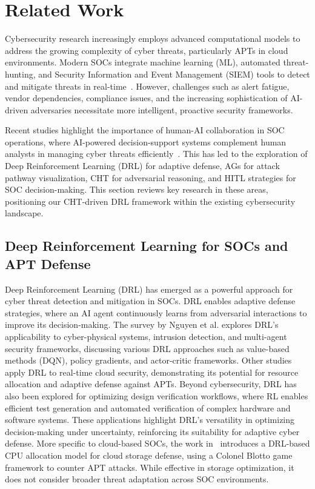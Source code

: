\section{Related Work}
Cybersecurity research increasingly employs advanced computational models to address the growing complexity of cyber threats, particularly APTs in cloud environments. Modern SOCs integrate machine learning (ML), automated threat-hunting, and Security Information and Event Management (SIEM) tools to detect and mitigate threats in real-time~\cite{peiris2021threat, muniz2021modern}. However, challenges such as alert fatigue, vendor dependencies, compliance issues, and the increasing sophistication of AI-driven adversaries necessitate more intelligent, proactive security frameworks.

Recent studies highlight the importance of human-AI collaboration in SOC operations, where AI-powered decision-support systems complement human analysts in managing cyber threats efficiently~\cite{chhetri2024humanAI}. This has led to the exploration of Deep Reinforcement Learning (DRL) for adaptive defense, AGs for attack pathway visualization, CHT for adversarial reasoning, and HITL strategies for SOC decision-making. This section reviews key research in these areas, positioning our CHT-driven DRL framework within the existing cybersecurity landscape.

\subsection{Deep Reinforcement Learning for SOCs and APT Defense}
Deep Reinforcement Learning (DRL) has emerged as a powerful approach for cyber threat detection and mitigation in SOCs. DRL enables adaptive defense strategies, where an AI agent continuously learns from adversarial interactions to improve its decision-making.
The survey by Nguyen et al.\cite{nguyen2021deep} explores DRL’s applicability to cyber-physical systems, intrusion detection, and multi-agent security frameworks, discussing various DRL approaches such as value-based methods (DQN), policy gradients, and actor-critic frameworks. Other studies apply DRL to real-time cloud security, demonstrating its potential for resource allocation and adaptive defense against APTs\cite{min2018defense}. Beyond cybersecurity, DRL has also been explored for optimizing design verification workflows, where RL enables efficient test generation and automated verification of complex hardware and software systems\cite{aref2024advanced}. These applications highlight DRL’s versatility in optimizing decision-making under uncertainty, reinforcing its suitability for adaptive cyber defense.
More specific to cloud-based SOCs, the work in~\cite{sakthivelu2023adaptive} introduces a DRL-based CPU allocation model for cloud storage defense, using a Colonel Blotto game framework to counter APT attacks. While effective in storage optimization, it does not consider broader threat adaptation across SOC environments.


